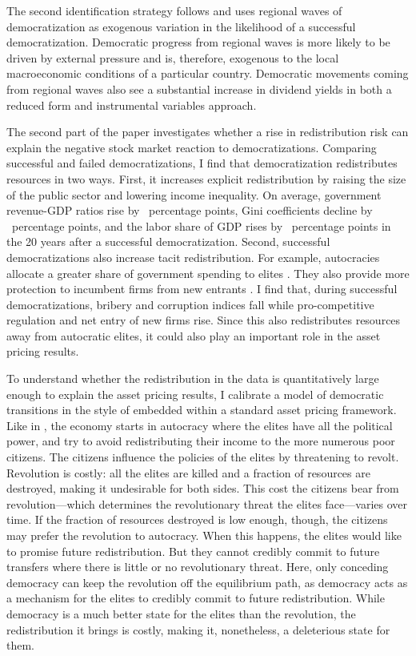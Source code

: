 \documentclass[12pt]{article}
\numberwithin{equation}{section}
\begin{document}
The second identification strategy follows \cite*{Acemoglu2019} and uses regional waves of democratization as exogenous variation in the likelihood of a successful democratization. Democratic progress from regional waves is more likely to be driven by external pressure and is, therefore, exogenous to the local macroeconomic conditions of a particular country.  Democratic movements coming from regional waves also see a substantial increase in dividend yields in both a reduced form and instrumental variables approach.

The second part of the paper investigates whether a rise in redistribution risk can explain the negative stock market reaction to democratizations.  Comparing successful and failed democratizations, I find that democratization redistributes resources in two ways. First, it increases explicit redistribution by raising the size of the public sector and lowering income inequality. On average, government revenue-GDP ratios rise by \tabEightOneCE\ percentage points, Gini coefficients decline by \tabEightThreeCE\ percentage points, and the labor share of GDP rises by \tabEightFourCE\ percentage points in the 20 years after a successful democratization. Second, successful democratizations also increase tacit redistribution. For example,  autocracies allocate a greater share of government spending to elites \citep{Tullock1986}. They also provide more protection to incumbent firms from new entrants \citep{Perotti2006,Bravo2021}. I find that, during successful democratizations, bribery and corruption indices fall while pro-competitive regulation and net entry of new firms rise. Since this also redistributes resources away from autocratic elites, it could also play an important role in the asset pricing results.

To understand whether the redistribution in the data is quantitatively large enough to explain the asset pricing results, I calibrate a model of democratic transitions in the style of \cite{Acemoglu2006} embedded within a standard asset pricing framework. Like in  \citeauthor{Acemoglu2006}, the economy starts in autocracy where the elites have all the political power, and try to avoid redistributing their income to the more numerous poor citizens. The citizens influence the policies of the elites by threatening to revolt. Revolution is costly: all the elites are killed and a fraction of resources are destroyed, making it undesirable for both sides.  This cost the citizens bear from revolution---which determines the revolutionary threat the elites face---varies over time.  If the fraction of resources destroyed is low enough, though, the citizens may prefer the revolution to autocracy.  When this happens, the elites would like to promise future redistribution.  But they cannot credibly commit to future transfers where there is little or no revolutionary threat. Here, only conceding democracy can keep the revolution off the equilibrium path, as democracy acts as a mechanism for the elites to credibly commit to future redistribution. While democracy is a much better state for the elites than the revolution, the redistribution it brings is costly, making it, nonetheless, a deleterious state for them. 
\end{document}
